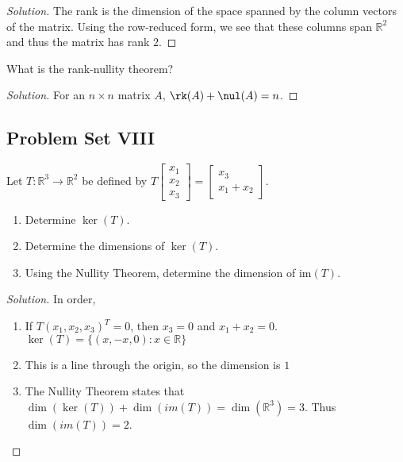 \documentclass[crop=false,class=book,oneside]{standalone}
\begin{document}
        \begin{proof}[Solution]
        The rank is the dimension of the space spanned by the column vectors of the matrix. Using the row-reduced form, we see that these columns span $\mathbb{R}^2$ and thus the matrix has rank $2$.
        \end{proof}
        \begin{problem}
        What is the rank-nullity theorem?
        \end{problem}
        \begin{proof}[Solution]
        For an $n\times n$ matrix $A$, $\rk(A)+\nul(A) = n$.
        \end{proof}
        \newpage
        \subsection{Problem Set VIII}
        \begin{problem}
        Let $T:\mathbb{R}^3\rightarrow \mathbb{R}^2$ be defined by $T\begin{bmatrix} x_1 \\ x_2 \\ x_3 \end{bmatrix} = \begin{bmatrix} x_3 \\ x_1+x_2 \end{bmatrix}$.
        \begin{enumerate}
            \item Determine $\ker(T)$.
            \item Determine the dimensions of $\ker(T)$.
            \item Using the Nullity Theorem, determine the dimension of im$(T)$.
        \end{enumerate}
        \end{problem}
        \begin{proof}[Solution]
        In order,
        \begin{enumerate}
            \item If $T(x_{1},x_{2},x_{3})^{T} = 0$, then $x_3=0$ and $x_{1}+x_{2}=0$. $\ker(T)=\{(x,-x,0):x\in \mathbb{R}\}$
            \item This is a line through the origin, so the dimension is $1$ 
            \item The Nullity Theorem states that $\dim(\ker(T))+\dim(im(T)) = \dim(\mathbb{R}^3) = 3$. Thus $\dim(im(T)) = 2$.
        \end{enumerate}
        \end{proof}
\end{document}
